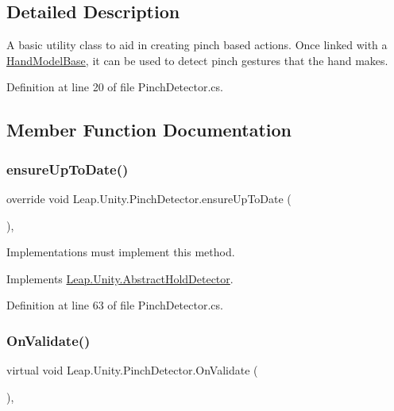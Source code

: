 \subsection{Detailed Description}
A basic utility class to aid in creating pinch based actions. Once linked with a \mbox{\hyperlink{class_leap_1_1_unity_1_1_hand_model_base}{Hand\+Model\+Base}}, it can be used to detect pinch gestures that the hand makes. 



Definition at line 20 of file Pinch\+Detector.\+cs.



\subsection{Member Function Documentation}
\mbox{\label{class_leap_1_1_unity_1_1_pinch_detector_aeab820b0fd278c0b8c654e5fe172be79}} 
\subsubsection{\texorpdfstring{ensureUpToDate()}{ensureUpToDate()}}
{\footnotesize\ttfamily override void Leap.\+Unity.\+Pinch\+Detector.\+ensure\+Up\+To\+Date (\begin{DoxyParamCaption}{ }\end{DoxyParamCaption})\hspace{0.3cm}{\ttfamily [protected]}, {\ttfamily [virtual]}}

Implementations must implement this method. 

Implements \mbox{\hyperlink{class_leap_1_1_unity_1_1_abstract_hold_detector_a89541e346c0eb1a0212944c94e407b82}{Leap.\+Unity.\+Abstract\+Hold\+Detector}}.



Definition at line 63 of file Pinch\+Detector.\+cs.

\mbox{\label{class_leap_1_1_unity_1_1_pinch_detector_a6631f57f4ca5742946d509f71e8b3c1c}} 
\subsubsection{\texorpdfstring{OnValidate()}{OnValidate()}}
{\footnotesize\ttfamily virtual void Leap.\+Unity.\+Pinch\+Detector.\+On\+Validate (\begin{DoxyParamCaption}{ }\end{DoxyParamCaption})\hspace{0.3cm}{\ttfamily [protected]}, {\ttfamily [virtual]}}



